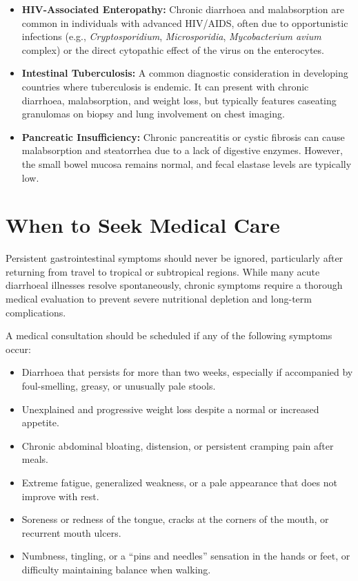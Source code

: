 \begin{itemize}
    \item \textbf{HIV-Associated Enteropathy:} Chronic diarrhoea and malabsorption are common in individuals with advanced HIV/AIDS, often due to opportunistic infections (e.g., \textit{Cryptosporidium}, \textit{Microsporidia}, \textit{Mycobacterium avium} complex) or the direct cytopathic effect of the virus on the enterocytes.
    \item \textbf{Intestinal Tuberculosis:} A common diagnostic consideration in developing countries where tuberculosis is endemic. It can present with chronic diarrhoea, malabsorption, and weight loss, but typically features caseating granulomas on biopsy and lung involvement on chest imaging.
    \item \textbf{Pancreatic Insufficiency:} Chronic pancreatitis or cystic fibrosis can cause malabsorption and steatorrhea due to a lack of digestive enzymes. However, the small bowel mucosa remains normal, and fecal elastase levels are typically low.
\end{itemize}

\section*{When to Seek Medical Care}
Persistent gastrointestinal symptoms should never be ignored, particularly after returning from travel to tropical or subtropical regions. While many acute diarrhoeal illnesses resolve spontaneously, chronic symptoms require a thorough medical evaluation to prevent severe nutritional depletion and long-term complications.

A medical consultation should be scheduled if any of the following symptoms occur:
\begin{itemize}
    \item Diarrhoea that persists for more than two weeks, especially if accompanied by foul-smelling, greasy, or unusually pale stools.
    \item Unexplained and progressive weight loss despite a normal or increased appetite.
    \item Chronic abdominal bloating, distension, or persistent cramping pain after meals.
    \item Extreme fatigue, generalized weakness, or a pale appearance that does not improve with rest.
    \item Soreness or redness of the tongue, cracks at the corners of the mouth, or recurrent mouth ulcers.
    \item Numbness, tingling, or a ``pins and needles'' sensation in the hands or feet, or difficulty maintaining balance when walking.
\end{itemize}

